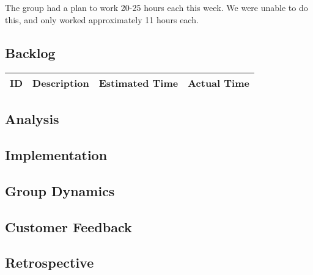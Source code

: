 \subparagraph{} The group had a plan to work 20-25 hours each this week. We were unable to do this, and only worked approximately 11 hours each. %

\subsection{Backlog}
\begin{tabular}{|l|p{6cm}|p{2cm}|p{2cm}|}
\hline
ID & Description & Estimated Time & Actual Time \\
\hline

\end{tabular}

\subsection{Analysis}

\subsection{Implementation}

\subsection{Group Dynamics}

\subsection{Customer Feedback}

\subsection{Retrospective}